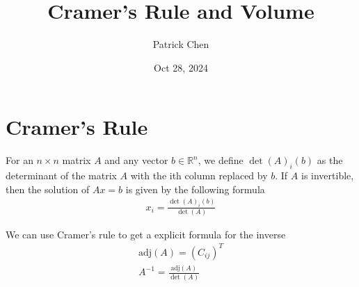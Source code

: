 \documentclass{article}
\title{Cramer's Rule and Volume}
\author{Patrick Chen}
\date{Oct 28, 2024}
\theoremstyle{mytheoremstyle}
\theoremstyle{mytheoremstyle}
\theoremstyle{myproblemstyle}
\newcommand\adj{\text{adj}}
\begin{document}
    \maketitle
    \section*{Cramer's Rule}
    For an $n\times n$ matrix $A$ and any vector $b\in \mathbb{R}^n$, we define
    $\det(A)_i(b)$ as the determinant of the matrix $A$ with the ith column
    replaced by $b$. If $A$ is invertible, then the solution of $Ax=b$ is given
    by the following formula
    \begin{align*}
        x_i = \frac{\det(A)_i(b)}{\det(A)}
    \end{align*}

    We can use Cramer's rule to get a explicit formula for the inverse
    \begin{align*}
        \adj(A) = (C_{ij})^T \\
        A^{-1} = \frac{\adj(A)}{\det(A)}
    \end{align*}
\end{document}
